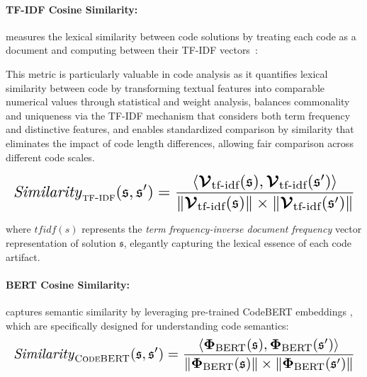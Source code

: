 \documentclass[11pt]{article}
\theoremstyle{definition}
\theoremstyle{remark}
\begin{document}
\paragraph{TF-IDF Cosine Similarity:} 
measures the lexical similarity between code solutions by treating each code as a document and computing between their TF-IDF vectors~\citep{ramos2003using}:

This metric is particularly valuable in code analysis as it quantifies lexical similarity between code by transforming textual features into comparable numerical values through statistical and weight analysis, balances commonality and uniqueness via the TF-IDF mechanism that considers both term frequency and distinctive features, and enables standardized comparison by similarity that eliminates the impact of code length differences, allowing fair comparison across different code scales.


\begin{equation}
\resizebox{\columnwidth}{!}{$\displaystyle
\mathit{Similarity}_{\textsc{tf-idf}}(\mathfrak{s}, \mathfrak{s}') = \frac{\langle \boldsymbol{\mathcal{V}}_{\text{tf-idf}}(\mathfrak{s}), \boldsymbol{\mathcal{V}}_{\text{tf-idf}}(\mathfrak{s}') \rangle}{\left\|\boldsymbol{\mathcal{V}}_{\text{tf-idf}}(\mathfrak{s})\right\| \times \left\|\boldsymbol{\mathcal{V}}_{\text{tf-idf}}(\mathfrak{s}')\right\|}
$}
\end{equation}


where $\boldsymbol{\mathit{tfidf}}(s)$ represents the \textit{term frequency-inverse document frequency} vector representation of solution $\mathfrak{s}$, elegantly capturing the lexical essence of each code artifact.


\paragraph{BERT Cosine Similarity:} captures semantic similarity by leveraging pre-trained CodeBERT embeddings \citep{feng2020codebert}, which are specifically designed for understanding code semantics:
\begin{equation}
\resizebox{\columnwidth}{!}{$\displaystyle
\mathit{Similarity}_{\textsc{CodeBERT}}(\mathfrak{s}, \mathfrak{s}') = \frac{\langle \boldsymbol{\Phi}_{\text{BERT}}(\mathfrak{s}), \boldsymbol{\Phi}_{\text{BERT}}(\mathfrak{s}') \rangle}{\left\|\boldsymbol{\Phi}_{\text{BERT}}(\mathfrak{s})\right\| \times \left\|\boldsymbol{\Phi}_{\text{BERT}}(\mathfrak{s}')\right\|}
$}
\end{equation}
\end{document}
